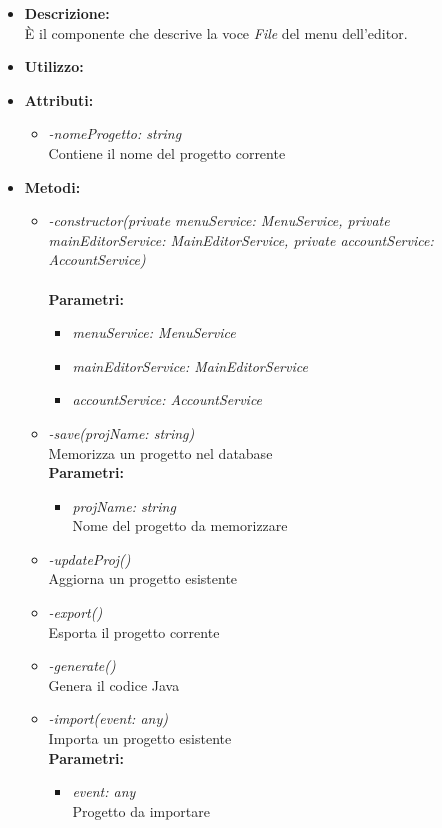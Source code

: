\begin{itemize}
	\item \textbf{Descrizione:}\\
	È il componente che descrive la voce \textit{File} del menu dell'editor.
	\item \textbf{Utilizzo:}\\
	
	\item \textbf{Attributi:}
		\begin{itemize}
			\item \emph{-nomeProgetto: string}\\
			Contiene il nome del progetto corrente
		\end{itemize}
	\item \textbf{Metodi:}
		\begin{itemize}
			\item \emph{-constructor(private menuService: MenuService,
    private mainEditorService: MainEditorService,
    private accountService: AccountService)}\\
    		\\
    		\textbf{Parametri:}
    		\begin{itemize}
    			\item \emph{menuService: MenuService}\\
    			
    			\item \emph{mainEditorService: MainEditorService}\\
    			
    			\item \emph{accountService: AccountService}\\
    			
    		\end{itemize}
    		\item \emph{-save(projName: string)}\\
    		Memorizza un progetto nel database\\
    		\textbf{Parametri:}
    		\begin{itemize}
    			\item \emph{projName: string}\\
    			Nome del progetto da memorizzare
    		\end{itemize}
    		\item \emph{-updateProj()}\\
    		Aggiorna un progetto esistente
    		\item \emph{-export()}\\
    		Esporta il progetto corrente
    		\item \emph{-generate()}\\
    		Genera il codice Java
    		\item \emph{-import(event: any)}\\
    		Importa un progetto esistente\\
    		\textbf{Parametri:}
    		\begin{itemize}
    			\item \emph{event: any}\\
    			Progetto da importare
    		\end{itemize}
		\end{itemize}
\end{itemize}